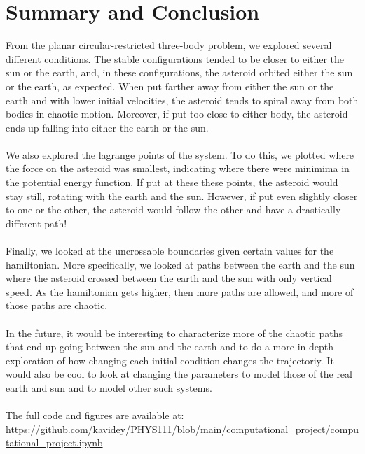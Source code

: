 \documentclass[11pt]{article}
\begin{document}



\section{Summary and Conclusion}
\label{sec:summary and conclusion}

From the planar circular-restricted three-body problem, we explored several different conditions. The stable configurations tended to be closer to either the sun or the earth, and, in these configurations, the asteroid orbited either the sun or the earth, as expected. When put farther away from either the sun or the earth and with lower initial velocities, the asteroid tends to spiral away from both bodies in chaotic motion. Moreover, if put too close to either body, the asteroid ends up falling into either the earth or the sun. 
\\
\\
\noindent
We also explored the lagrange points of the system. To do this, we plotted where the force on the asteroid was smallest, indicating where there were minimima in the potential energy function. If put at these these points, the asteroid would stay still, rotating with the earth and the sun. However, if put even slightly closer to one or the other, the asteroid would follow the other and have a drastically different path! 
\\
\\
\noindent
Finally, we looked at the uncrossable boundaries given certain values for the hamiltonian. More specifically, we looked at paths between the earth and the sun where the asteroid crossed between the earth and the sun with only vertical speed. As the hamiltonian gets higher, then more paths are allowed, and more of those paths are chaotic. 
\\
\\
\noindent
In the future, it would be interesting to characterize more of the chaotic paths that end up going between the sun and the earth and to do a more in-depth exploration of how changing each initial condition changes the trajectoriy. It would also be cool to look at changing the parameters to model those of the real earth and sun and to model other such systems.
\\
\\
\noindent
The full code and figures are available at: \\
\url{https://github.com/kavidey/PHYS111/blob/main/computational_project/computational_project.ipynb}
\end{document}
